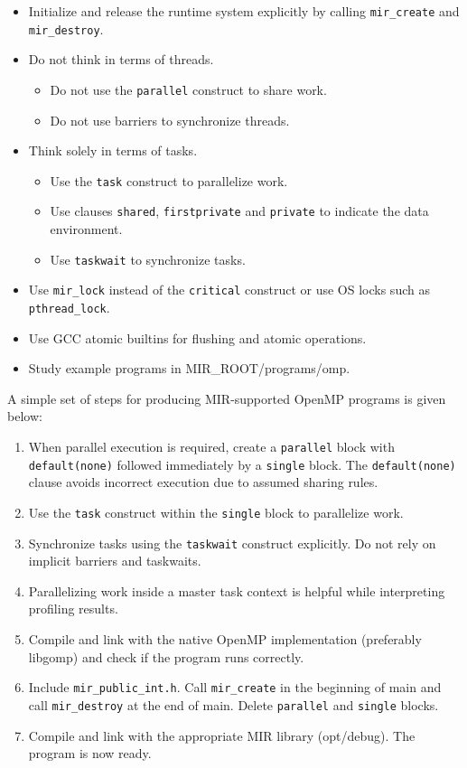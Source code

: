 \documentclass[11pt,a4paper]{article}
\begin{document}
\begin{itemize}
	\item Initialize and release the runtime system explicitly by calling \lstinline!mir_create! and \lstinline!mir_destroy!.
	\item Do not think in terms of threads.
    \begin{itemize}
        \item Do not use the \lstinline!parallel! construct to share work.
        \item Do not use barriers to synchronize threads.
    \end{itemize}
	\item Think solely in terms of tasks.
    \begin{itemize}
        \item Use the \lstinline!task! construct to parallelize work.
        \item Use clauses \lstinline!shared!, \lstinline!firstprivate! and \lstinline!private! to indicate the data environment.
        \item Use \lstinline!taskwait! to synchronize tasks.
    \end{itemize}
	\item Use \lstinline!mir_lock! instead of the \lstinline!critical! construct or use OS locks such as \lstinline!pthread_lock!.
	\item Use GCC atomic builtins for flushing and atomic operations.
	\item Study example programs in MIR\_ROOT/programs/omp.
\end{itemize}

A simple set of steps for producing MIR-supported OpenMP programs is given below:

\begin{enumerate}
\item When parallel execution is required, create a \lstinline!parallel!  block with \lstinline!default(none)! followed immediately by a \lstinline!single! block. The \lstinline!default(none)! clause avoids incorrect execution due to assumed sharing rules.
\item Use the \lstinline!task! construct within the \lstinline!single! block to parallelize work.
\item Synchronize tasks using the \lstinline!taskwait! construct explicitly. Do not rely on implicit barriers and taskwaits.
\item Parallelizing work inside a master task context is helpful while interpreting profiling results.
\item Compile and link with the native OpenMP implementation (preferably libgomp) and check if the program runs correctly.
\item Include \lstinline!mir_public_int.h!. Call \lstinline!mir_create! in the beginning of main and call \lstinline!mir_destroy! at the end of main. Delete \lstinline!parallel! and \lstinline!single! blocks.
\item Compile and link with the appropriate MIR library (opt/debug). The program is now ready.
\end{enumerate}
\end{document}
